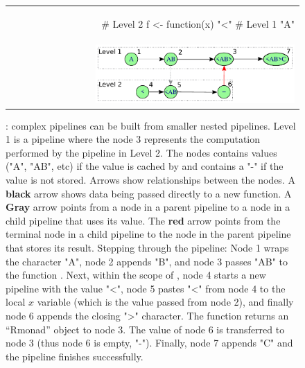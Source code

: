 \begin{figure}[!htbp]
  \centering
  \begin{tabular}{| r |}
    \hline
    \begin{minipage}{0.95\textwidth}
\vspace{1mm}
\begin{example}   
# Level 2
f <- function(x) {
  "<" %
}
# Level 1
"A" %
\end{example}
    \end{minipage}
    \\
    \begin{minipage}{0.95\textwidth}
    \centering
    \includegraphics[width=0.7\textwidth]{Images/rmonad_nest}
    \end{minipage}
    \\
    \hline
  \end{tabular}
  \caption{: complex  pipelines  can  be  built  from  smaller  nested pipelines. Level 1 is a pipeline where the node 3 represents the computation performed by the pipeline in Level 2. The nodes contains values ("A", "AB", etc) if the value is cached by  and contains a "-" if the value is not stored. Arrows show relationships between the nodes. A \textbf{black} arrow shows data being passed directly to a new function. A \textbf{Gray} arrow points from a node in a parent pipeline to a node in a child pipeline that uses its value. The \textbf{red} arrow points from the terminal node in a child pipeline to the node in the parent pipeline that stores its result. Stepping through the pipeline: Node 1 wraps the character "A", node 2 appends "B", and node 3 passes "AB" to the function . Next, within the scope of , node 4 starts a new pipeline with the value "<", node 5 pastes "<" from node 4 to the local $x$ variable (which is the value passed from node 2), and finally node 6 appends the closing ">" character. The function  returns an ``Rmonad'' object to node 3. The value of node 6 is transferred to node 3 (thus node 6 is empty, "-"). Finally, node 7 appends "C" and the pipeline finishes successfully.}
  \label{fig:rmonad-nest}
\end{figure}



